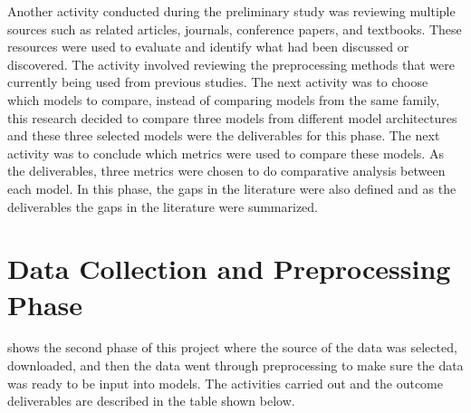 Another activity conducted during the preliminary study was reviewing multiple sources such as related articles, journals, conference papers, and textbooks. These resources were used to evaluate and identify what had been discussed or discovered. The activity involved reviewing the preprocessing methods that were currently being used from previous studies. The next activity was to choose which models to compare, instead of comparing models from the same family, this research decided to compare three models from different model architectures and these three selected models were the deliverables for this phase. The next activity was to conclude which metrics were used to compare these models. As the deliverables, three metrics were chosen to do comparative analysis between each model. In this phase, the gaps in the literature were also defined and as the deliverables the gaps in the literature were summarized.

\section{Data Collection and Preprocessing Phase}
 shows the second phase of this project where the source of the data was selected, downloaded, and then the data went through preprocessing to make sure the data was ready to be input into models. The activities carried out and the outcome deliverables are described in the table shown below.
\vspace{1em}
 
